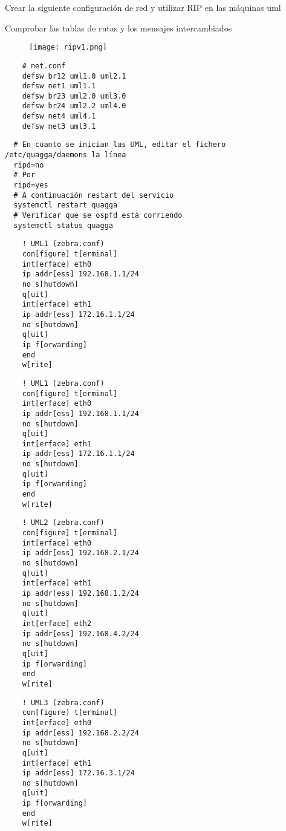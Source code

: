 Crear la siguiente configuración de red y utilizar RIP en las
máquinas uml

Comprobar las tablas de rutas y los mensajes intercambiados

  \begin{figure}[h]
    \texttt{[image: ripv1.png]}
    \centering
  \end{figure}

  \begin{verbatim}
    # net.conf
    defsw br12 uml1.0 uml2.1
    defsw net1 uml1.1
    defsw br23 uml2.0 uml3.0
    defsw br24 uml2.2 uml4.0
    defsw net4 uml4.1
    defsw net3 uml3.1
  \end{verbatim}
  
  \begin{verbatim}
  # En cuanto se inician las UML, editar el fichero /etc/quagga/daemons la línea
  ripd=no
  # Por
  ripd=yes
  # A continuación restart del servicio
  systemctl restart quagga
  # Verificar que se ospfd está corriendo
  systemctl status quagga
\end{verbatim}
  
  \begin{verbatim}
    ! UML1 (zebra.conf)
    con[figure] t[erminal]
    int[erface] eth0
    ip addr[ess] 192.168.1.1/24
    no s[hutdown]
    q[uit]
    int[erface] eth1
    ip addr[ess] 172.16.1.1/24
    no s[hutdown]
    q[uit]
    ip f[orwarding]
    end
    w[rite]
  \end{verbatim}
  
  \begin{verbatim}
    ! UML1 (zebra.conf)
    con[figure] t[erminal]
    int[erface] eth0
    ip addr[ess] 192.168.1.1/24
    no s[hutdown]
    q[uit]
    int[erface] eth1
    ip addr[ess] 172.16.1.1/24
    no s[hutdown]
    q[uit]
    ip f[orwarding]
    end
    w[rite]
  \end{verbatim}
  
  \begin{verbatim}
    ! UML2 (zebra.conf)
    con[figure] t[erminal]
    int[erface] eth0
    ip addr[ess] 192.168.2.1/24
    no s[hutdown]
    q[uit]
    int[erface] eth1
    ip addr[ess] 192.168.1.2/24
    no s[hutdown]
    q[uit]
    int[erface] eth2
    ip addr[ess] 192.168.4.2/24
    no s[hutdown]
    q[uit]
    ip f[orwarding]
    end
    w[rite]
  \end{verbatim}
  
  \begin{verbatim}
    ! UML3 (zebra.conf)
    con[figure] t[erminal]
    int[erface] eth0
    ip addr[ess] 192.168.2.2/24
    no s[hutdown]
    q[uit]
    int[erface] eth1
    ip addr[ess] 172.16.3.1/24
    no s[hutdown]
    q[uit]
    ip f[orwarding]
    end
    w[rite]
  \end{verbatim}
  
